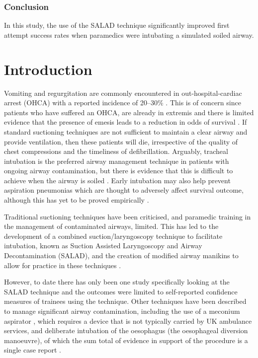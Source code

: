 \documentclass[]{article}
\begin{document}
\hypertarget{conclusion}{%
\subsubsection{Conclusion}\label{conclusion}}

In this study, the use of the SALAD technique significantly improved
first attempt success rates when paramedics were intubating a simulated
soiled airway.

\hypertarget{intro}{%
\section{Introduction}\label{intro}}

Vomiting and regurgitation are commonly encountered in
out-hospital-cardiac arrest (OHCA) with a reported incidence of 20--30\%
\citep{benger_effect_2018, voss_how_2014, simons_incidence_2007}. This
is of concern since patients who have suffered an OHCA, are already in
extremis and there is limited evidence that the presence of emesis leads
to a reduction in odds of survival \citep{simons_incidence_2007}. If
standard suctioning techniques are not sufficient to maintain a clear
airway and provide ventilation, then these patients will die,
irrespective of the quality of chest compressions and the timeliness of
defibrillation. Arguably, tracheal intubation is the preferred airway
management technique in patients with ongoing airway contamination, but
there is evidence that this is difficult to achieve when the airway is
soiled \citep{sakles_impact_2017}. Early intubation may also help
prevent aspiration pneumonias which are thought to adversely affect
survival outcome, although this has yet to be proved empirically
\citep{christ_early-onset_2016}.

Traditional suctioning techniques have been criticised, and paramedic
training in the management of contaminated airways, limited. This has
led to the development of a combined suction/laryngoscopy technique to
facilitate intubation, known as Suction Assisted Laryngoscopy and Airway
Decontamination (SALAD), and the creation of modified airway manikins to
allow for practice in these techniques \citep{ducanto_novel_2017}.

However, to date there has only been one study specifically looking at
the SALAD technique and the outcomes were limited to self-reported
confidence measures of trainees using the technique. Other techniques
have been described to manage significant airway contamination,
including the use of a meconium aspirator \citep{kei_comparing_2017},
which requires a device that is not typically carried by UK ambulance
services, and deliberate intubation of the oesophagus (the oesophageal
diversion manoeuvre), of which the sum total of evidence in support of
the procedure is a single case report \citep{kornhall_intentional_2015}.
\end{document}
